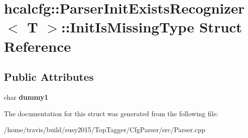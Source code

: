 \hypertarget{structhcalcfg_1_1ParserInitExistsRecognizer_1_1InitIsMissingType}{\section{hcalcfg\-:\-:Parser\-Init\-Exists\-Recognizer$<$ T $>$\-:\-:Init\-Is\-Missing\-Type Struct Reference}
\label{structhcalcfg_1_1ParserInitExistsRecognizer_1_1InitIsMissingType}
}
\subsection*{Public Attributes}
\begin{DoxyCompactItemize}
\item 
\hypertarget{structhcalcfg_1_1ParserInitExistsRecognizer_1_1InitIsMissingType_abb1ead880d0054dbf127306fcc9804ac}{char {\bfseries dummy1}}\label{structhcalcfg_1_1ParserInitExistsRecognizer_1_1InitIsMissingType_abb1ead880d0054dbf127306fcc9804ac}

\end{DoxyCompactItemize}


The documentation for this struct was generated from the following file\-:\begin{DoxyCompactItemize}
\item 
/home/travis/build/susy2015/\-Top\-Tagger/\-Cfg\-Parser/src/Parser.\-cpp\end{DoxyCompactItemize}
